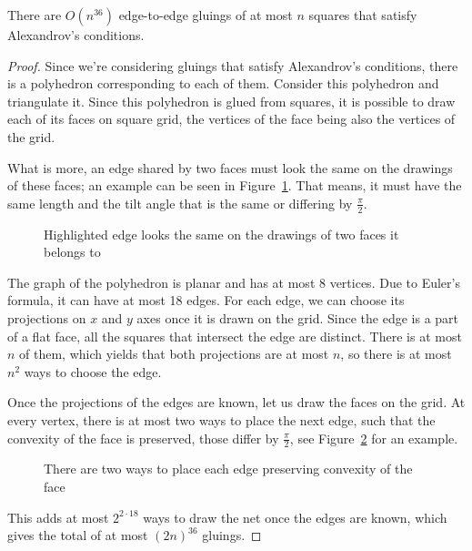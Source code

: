 \documentclass[a4paper,11pt]{article}
\begin{document}
\begin{theorem}
	There are $O \left( n^{36} \right)$ edge-to-edge gluings of at most $n$ squares that satisfy Alexandrov's conditions.
\end{theorem}

\begin{proof}
Since we're considering gluings that satisfy Alexandrov's conditions, there is a polyhedron corresponding to each of them. Consider this polyhedron and triangulate it. Since this polyhedron is glued from squares, it is possible to draw each of its faces on square grid, the vertices of the face being also the vertices of the grid.

What is more, an edge shared by two faces must look the same on the drawings of these faces; an example can be seen in Figure~\ref{fig:edgesMeeting}. That means, it must have the same length and the tilt angle that is the same or differing by $\frac{\pi}{2}$. 

\begin{figure}[h] \centering
{}\hspace{1.2cm}
\caption{Highlighted edge looks the same on the drawings of two faces it belongs to}
\label{fig:edgesMeeting}
\end{figure}

The graph of the polyhedron is planar and has at most 8 vertices. Due to Euler's formula, it can have at most 18 edges. For each edge, we can choose its projections on $x$ and $y$ axes once it is drawn on the grid. Since the edge is a part of a flat face, all the squares that intersect the edge are distinct. There is at most $n$ of them, which yields that both projections are at most $n$, so there is at most $n^2$ ways to choose the edge.

Once the projections of the edges are known, let us draw the faces on the grid. At every vertex, there is at most two ways to place the next edge, such that the convexity of the face is preserved, those differ by $\frac{\pi}{2}$, see Figure~\ref{fig:twoWays} for an example.

\begin{figure}[h] \centering
{}
\caption{There are two ways to place each edge preserving convexity of the face}
\label{fig:twoWays}
\end{figure}

This adds at most $2^{2 \cdot 18}$ ways to draw the net once the edges are known, which gives the total of at most $(2n)^{36}$ gluings.
\end{proof}
\end{document}
